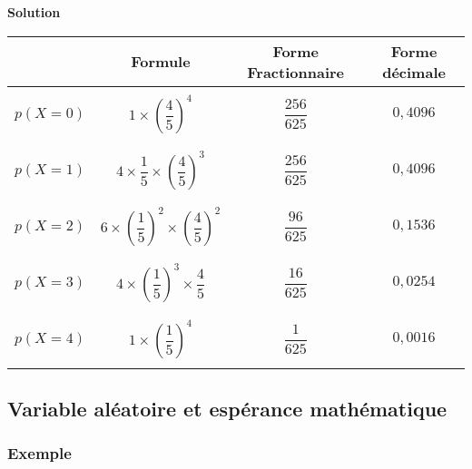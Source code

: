 \vspace*{.3cm}

\textbf{Solution} \\

\begin{tabular}{|c|c|c|c|}
\hline
& Formule & Forme Fractionnaire & Forme décimale \\
\hline
& & & \\
$p\left(X = 0\right)$ & \color{red} $1 \times \left(\dfrac{4}{5}\right)^4$ \color{black} & \color{red} $\dfrac{256}{625}$ \color{black} & \color{red} $0,4096$ \color{black} \\ 
& & & \\
\hline
& & & \\
$p\left(X = 1\right)$ & \color{red} $4 \times \dfrac{1}{5} \times \left(\dfrac{4}{5}\right)^3$ \color{black} & \color{red} $\dfrac{256}{625}$ \color{black} & \color{red} $0,4096$ \color{black} \\ 
& & & \\
\hline
& & & \\
$p\left(X = 2\right)$ & \color{red} $6 \times \left(\dfrac{1}{5}\right)^2 \times \left(\dfrac{4}{5}\right)^2$ \color{black} & \color{red} $\dfrac{96}{625}$ \color{black} & \color{red} $0,1536$ \color{black} \\ 
& & & \\
\hline
& & & \\
$p\left(X = 3\right)$ & \color{red} $4 \times \left(\dfrac{1}{5}\right)^3 \times \dfrac{4}{5}$ \color{black} & \color{red} $\dfrac{16}{625}$ \color{black} & \color{red} $0,0254$ \color{black} \\ 
& & & \\
\hline
& & & \\
$p\left(X = 4\right)$ & \color{red} $1 \times \left(\dfrac{1}{5}\right)^4$ \color{black} & \color{red} $\dfrac{1}{625}$ \color{black} & \color{red} $0,0016$ \color{black} \\ 
& & & \\
\hline
\end{tabular}

\vspace*{-5cm}

\newpage

\subsection{Variable aléatoire et espérance mathématique}

\subsubsection{Exemple}

